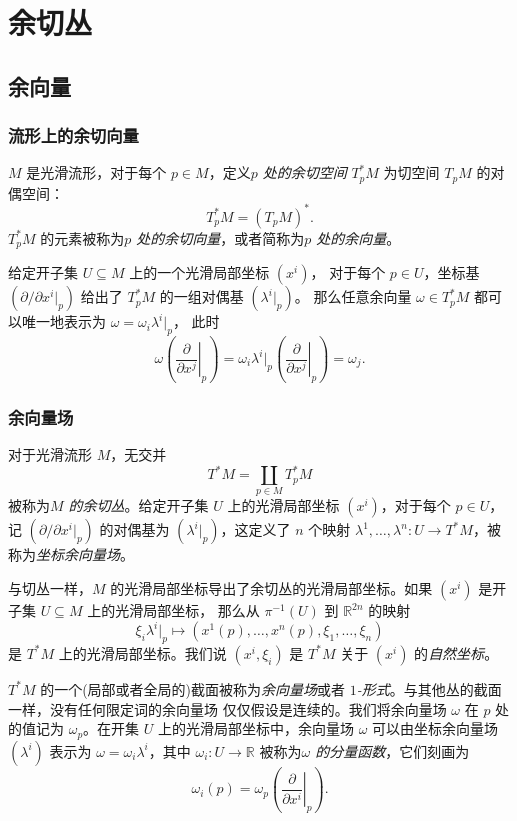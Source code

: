 \documentclass[fontset=none]{Notes}
\begin{document}
\chapter{余切丛}

\section{余向量}

\subsection{流形上的余切向量}

$M$ 是光滑流形，对于每个 $p\in M$，定义\emph{$p$ 处的余切空间}
$T_p^*M$ 为切空间 $T_pM$ 的对偶空间：
\[
  T_p^*M=(T_pM)^*.  
\]
$T_p^*M$ 的元素被称为\emph{$p$ 处的余切向量}，或者简称为\emph{$p$ 处的余向量}。

给定开子集 $U\subseteq M$ 上的一个光滑局部坐标 $\left(x^i\right)$，
对于每个 $p\in U$，坐标基 $\left(\partial /\partial x^i|_p\right)$
给出了 $T_p^*M$ 的一组对偶基 $\left(\lambda^i|_p\right)$。
那么任意余向量 $\omega\in T_p^*M$ 都可以唯一地表示为 $\omega=\omega_i\lambda^i|_p$，
此时
\[
  \omega\left(\left.\frac{\partial}{\partial x^j}\right|_p\right)=\omega_i  
  \lambda^i|_p\left(\left.\frac{\partial}{\partial x^j}\right|_p\right)
  =\omega_j.
\]

\subsection{余向量场}

对于光滑流形 $M$，无交并
\[
  T^*M=\coprod_{p\in M}T_p^*M  
\]
被称为\emph{$M$ 的余切丛}。给定开子集 $U$ 上的光滑局部坐标
$\left(x^i\right)$，对于每个 $p\in U$，记 $\left(\partial/\partial x^i|_p\right)$
的对偶基为 $\left(\lambda^i|_p\right)$，这定义了 $n$ 个映射
$\lambda^1,\dots,\lambda^n:U\to T^*M$，被称为\emph{坐标余向量场}。

与切丛一样，$M$ 的光滑局部坐标导出了余切丛的光滑局部坐标。如果 
$\left(x^i\right)$ 是开子集 $U\subseteq M$ 上的光滑局部坐标，
那么从 $\pi^{-1}(U)$ 到 $\mathbb{R}^{2n}$ 的映射
\[
  \xi_i\lambda^i|_p \mapsto 
  \left(x^1(p),\dots,x^n(p),\xi_1,\dots,\xi_n\right)
\]
是 $T^*M$ 上的光滑局部坐标。我们说 $\left(x^i,\xi_i\right)$ 是
$T^*M$ 关于 $\left(x^i\right)$ 的\emph{自然坐标}。

$T^*M$ 的一个(局部或者全局的)截面被称为\emph{余向量场}或者
\emph{$1$-形式}。与其他丛的截面一样，没有任何限定词的余向量场
仅仅假设是连续的。我们将余向量场 $\omega$ 在 $p$ 处的值记为
$\omega_p$。在开集 $U$ 上的光滑局部坐标中，余向量场 $\omega$
可以由坐标余向量场 $\left(\lambda^i\right)$ 表示为
$\omega=\omega_i\lambda^i$，其中 $\omega_i:U\to \mathbb{R}$
被称为\emph{$\omega$ 的分量函数}，它们刻画为
\[
  \omega_i(p)=\omega_p\left(\left.\frac{\partial}{\partial x^i}\right|_p\right).  
\]
\end{document}

